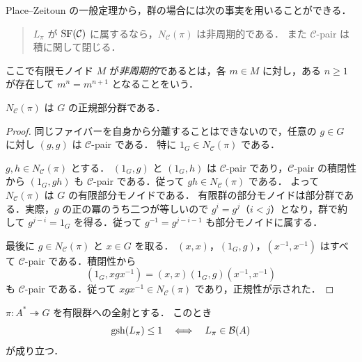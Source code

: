 Place--Zeitoun の一般定理から，群の場合には次の事実を用いることができる．

\begin{quote}
$L_\pi$ が $\operatorname{SF}(\mathcal C)$ に属するなら，$N_{\mathcal C}(\pi)$ は非周期的である．
また $\mathcal C$-pair は積に関して閉じる．
\end{quote}

ここで有限モノイド $M$ が\emph{非周期的}であるとは，各 $m\in M$ に対し，ある $n\geq1$ が存在して $m^n=m^{n+1}$ となることをいう．

\begin{lemma}\label{lem:N-normal}
$N_{\mathcal C}(\pi)$ は $G$ の正規部分群である．
\end{lemma}

\begin{proof}
同じファイバーを自身から分離することはできないので，任意の $g\in G$ に対し $(g,g)$ は $\mathcal C$-pair である．
特に $1_G\in N_{\mathcal C}(\pi)$ である．

$g,h\in N_{\mathcal C}(\pi)$ とする．
$(1_G,g)$ と $(1_G,h)$ は $\mathcal C$-pair であり，$\mathcal C$-pair の積閉性から $(1_G,gh)$ も $\mathcal C$-pair である．従って $gh\in N_{\mathcal C}(\pi)$ である．
よって $N_{\mathcal C}(\pi)$ は $G$ の有限部分モノイドである．
有限群の部分モノイドは部分群である．実際，$g$ の正の冪のうち二つが等しいので $g^i=g^j$（$i<j$）となり，群で約して $g^{j-i}=1_G$ を得る．従って $g^{-1}=g^{j-i-1}$ も部分モノイドに属する．

最後に $g\in N_{\mathcal C}(\pi)$ と $x\in G$ を取る．
$(x,x)$，$(1_G,g)$，$(x^{-1},x^{-1})$ はすべて $\mathcal C$-pair である．積閉性から
\[
(1_G,xgx^{-1})=(x,x)(1_G,g)(x^{-1},x^{-1})
\]
も $\mathcal C$-pair である．従って $xgx^{-1}\in N_{\mathcal C}(\pi)$ であり，正規性が示された．
\end{proof}

\begin{proposition}[有限群における外側連接の除去]\label{prop:group-collapse}
$\pi:A^*\twoheadrightarrow G$ を有限群への全射とする．
このとき
\[
\operatorname{gsh}(L_\pi)\leq1
\quad\Longleftrightarrow\quad
L_\pi\in\mathcal B(A)
\]
が成り立つ．
\end{proposition}


